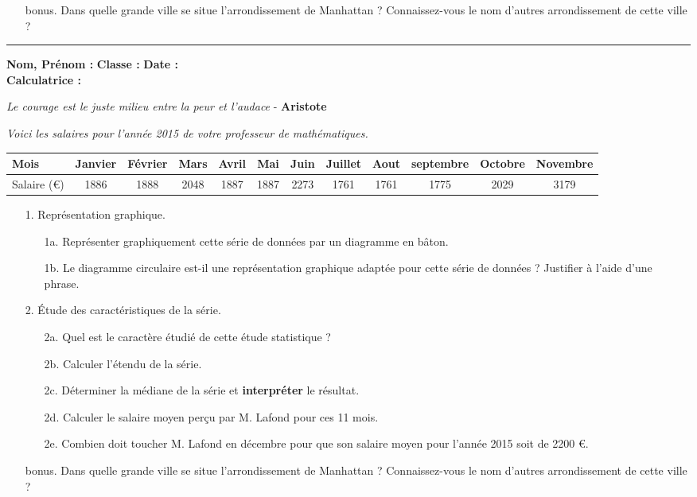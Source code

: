 \documentclass[12pt]{article}
\newcommand{\horrule}[1]{\rule{\linewidth}{#1}} %
\begin{document}
\begin{enumerate}
\item[bonus.] Dans quelle grande ville se situe l'arrondissement de Manhattan ? Connaissez-vous le nom d'autres arrondissement de cette ville ?
\end{enumerate}

\horrule{1px}


\textbf{Nom, Prénom :} \hspace{8cm} \textbf{Classe :} \hspace{3cm} \textbf{Date :}\\
\textbf{Calculatrice :}

\begin{center}
  \textit{Le courage est le juste milieu entre la peur et l'audace} - \textbf{Aristote}
\end{center}

\textit{Voici les salaires pour l'année 2015 de votre professeur de mathématiques.}

\begin{center}
  \begin{tabular}{| l || c | c | c  | c  | c  | c  | c  | c  | c  | c  | c |}
    \hline
    Mois & Janvier & Février & Mars & Avril &  Mai & Juin & Juillet & Aout & septembre & Octobre & Novembre \\
    \hline 
    Salaire (\euro) &   1886  &    1888 & 2048 &  1887 & 1887 & 2273    & 1761 & 1761 &      1775 &    2029 &     3179 \\
    \hline
  \end{tabular}
\end{center}

\begin{enumerate}
\item[1.] Représentation graphique.
  \begin{enumerate}
  \item[1a.] Représenter graphiquement cette série de données par un diagramme en bâton.
  \item[1b.] Le diagramme circulaire est-il une représentation graphique adaptée pour cette série de données ? Justifier à l'aide d'une phrase.
  \end{enumerate}

\item[2.] Étude des caractéristiques de la série.

  \begin{enumerate}
  \item[2a.] Quel est le caractère étudié de cette étude statistique ?
  \item[2b.] Calculer l'étendu de la série.
  \item[2c.] Déterminer la médiane de la série et \textbf{interpréter} le résultat.
  \item[2d.] Calculer le salaire moyen perçu par M. Lafond pour ces 11 mois.
  \item[2e.] Combien doit toucher M. Lafond en décembre pour que son salaire moyen pour l'année 2015 soit de 2200 \euro.		
  \end{enumerate}

\end{enumerate}

\begin{enumerate}
\item[bonus.] Dans quelle grande ville se situe l'arrondissement de Manhattan ? Connaissez-vous le nom d'autres arrondissement de cette ville ?
\end{enumerate}
\end{document}
